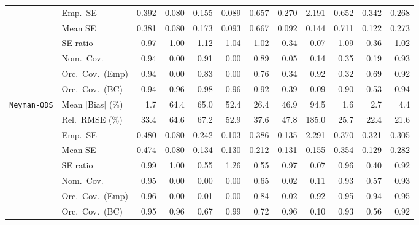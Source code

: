 \begin{landscape}
\begin{longtable}{llrrrrrrrrrr}
 & Emp.\ SE & 0.392 & 0.080 & 0.155 & 0.089 & 0.657 & 0.270 & 2.191 & 0.652 & 0.342 & 0.268 \\
 & Mean SE & 0.381 & 0.080 & 0.173 & 0.093 & 0.667 & 0.092 & 0.144 & 0.711 & 0.122 & 0.273 \\
 & SE ratio & \cellcolor{rankthree}0.97 & \cellcolor{rankone}1.00 & 1.12 & 1.04 & \cellcolor{ranktwo}1.02 & 0.34 & 0.07 & 1.09 & 0.36 & \cellcolor{ranktwo}1.02 \\
 & Nom.\ Cov. & \cellcolor{rankone}0.94 & 0.00 & \cellcolor{rankthree}0.91 & 0.00 & 0.89 & 0.05 & 0.14 & 0.35 & 0.19 & \cellcolor{ranktwo}0.93 \\
 & Orc.\ Cov.\ (Emp) & \cellcolor{rankone}0.94 & 0.00 & \cellcolor{rankthree}0.83 & 0.00 & 0.76 & 0.34 & \cellcolor{ranktwo}0.92 & 0.32 & 0.69 & \cellcolor{ranktwo}0.92 \\
 & Orc.\ Cov.\ (BC) & \cellcolor{rankone}0.94 & \cellcolor{rankone}0.96 & \cellcolor{ranktwo}0.98 & \cellcolor{rankone}0.96 & \cellcolor{ranktwo}0.92 & 0.39 & 0.09 & \cellcolor{rankthree}0.90 & 0.53 & \cellcolor{rankone}0.94 \\
\addlinespace[2pt]
\quad \texttt{Neyman-ODS} & Mean $|$Bias$|$ (\%) & \cellcolor{ranktwo}1.7 & 64.4 & 65.0 & 52.4 & 26.4 & 46.9 & 94.5 & \cellcolor{rankone}1.6 & \cellcolor{rankthree}2.7 & 4.4 \\
 & Rel.\ RMSE (\%) & 33.4 & 64.6 & 67.2 & 52.9 & 37.6 & 47.8 & 185.0 & \cellcolor{rankthree}25.7 & \cellcolor{ranktwo}22.4 & \cellcolor{rankone}21.6 \\
 & Emp.\ SE & 0.480 & 0.080 & 0.242 & 0.103 & 0.386 & 0.135 & 2.291 & 0.370 & 0.321 & 0.305 \\
 & Mean SE & 0.474 & 0.080 & 0.134 & 0.130 & 0.212 & 0.131 & 0.155 & 0.354 & 0.129 & 0.282 \\
 & SE ratio & \cellcolor{ranktwo}0.99 & \cellcolor{rankone}1.00 & 0.55 & 1.26 & 0.55 & \cellcolor{rankthree}0.97 & 0.07 & 0.96 & 0.40 & 0.92 \\
 & Nom.\ Cov. & \cellcolor{rankone}0.95 & 0.00 & 0.00 & 0.00 & \cellcolor{rankthree}0.65 & 0.02 & 0.11 & \cellcolor{ranktwo}0.93 & 0.57 & \cellcolor{ranktwo}0.93 \\
 & Orc.\ Cov.\ (Emp) & \cellcolor{ranktwo}0.96 & 0.00 & 0.01 & 0.00 & 0.84 & 0.02 & \cellcolor{rankthree}0.92 & \cellcolor{rankone}0.95 & \cellcolor{ranktwo}0.94 & \cellcolor{rankone}0.95 \\
 & Orc.\ Cov.\ (BC) & \cellcolor{rankone}0.95 & \cellcolor{ranktwo}0.96 & 0.67 & 0.99 & 0.72 & \cellcolor{ranktwo}0.96 & 0.10 & \cellcolor{rankthree}0.93 & 0.56 & 0.92 \\

\end{longtable}
\end{landscape}
